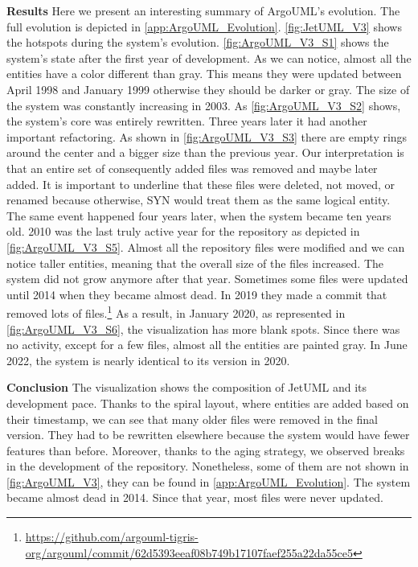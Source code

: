 \textbf{Results}
Here we present an interesting summary of ArgoUML's evolution. The full evolution is depicted in  \autoref{app:ArgoUML_Evolution}. \autoref{fig:JetUML_V3} shows the hotspots during the system's evolution. \autoref{fig:ArgoUML_V3_S1} shows the system's state after the first year of development. As we can notice, almost all the entities have a color different than gray. This means they were updated between April 1998 and January 1999 otherwise they should be darker or gray. The size of the system was constantly increasing in 2003. As \autoref{fig:ArgoUML_V3_S2} shows, the system's core was entirely rewritten. Three years later it had another important refactoring. As shown in \autoref{fig:ArgoUML_V3_S3} there are empty rings around the center and a bigger size than the previous year. Our interpretation is that an entire set of consequently added files was removed and maybe later added. It is important to underline that these files were deleted, not moved, or renamed because otherwise, SYN would treat them as the same logical entity. The same event happened four years later, when the system became ten years old. 2010 was the last truly active year for the repository as depicted in \autoref{fig:ArgoUML_V3_S5}. Almost all the repository files were modified and we can notice taller entities, meaning that the overall size of the files increased. The system did not grow anymore after that year. Sometimes some files were updated until 2014 when they became almost dead. In 2019 they made a commit that removed lots of files.\footnote{\url{https://github.com/argouml-tigris-org/argouml/commit/62d5393eeaf08b749b17107faef255a22da55ce5}} As a result, in January 2020, as represented in \autoref{fig:ArgoUML_V3_S6}, the visualization has more blank spots. Since there was no activity, except for a few files, almost all the entities are painted gray. In June 2022, the system is nearly identical to its version in 2020. 

\bigbreak
\textbf{Conclusion}
The visualization shows the composition of JetUML and its development pace. Thanks to the spiral layout, where entities are added based on their timestamp, we can see that many older files were removed in the final version. They had to be rewritten elsewhere because the system would have fewer features than before. Moreover, thanks to the aging strategy, we observed breaks in the development of the repository. Nonetheless, some of them are not shown in \autoref{fig:ArgoUML_V3}, they can be found in \autoref{app:ArgoUML_Evolution}. The system became almost dead in 2014. Since that year, most files were never updated. 



